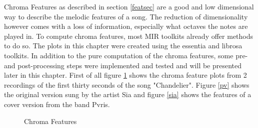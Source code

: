Chroma Features as described in section \ref{featsec} are a good and low dimensional way to describe the melodic features of a song. The reduction of dimensionality however comes with a loss of information, especially what octaves the notes are played in. To compute chroma features, most MIR toolkits already offer methods to do so. The plots in this chapter were created using the essentia \cite{essentia1} and librosa \cite{librosa1} toolkits. 
In addition to the pure computation of the chroma features, some pre- and post-processing steps were implemented and tested and will be presented later in this chapter. 
First of all figure \ref{fig:chroma1} shows the chroma feature plots from 2 recordings of the first thirty seconds of the song "Chandelier". Figure \ref{pv} shows the original version sung by the artist Sia and figure \ref{sia} shows the features of a cover version from the band Pvris. 
\begin{figure}[htbp]
	\centering
	\caption{Chroma Features}
	\label{fig:chroma1}
\end{figure}

